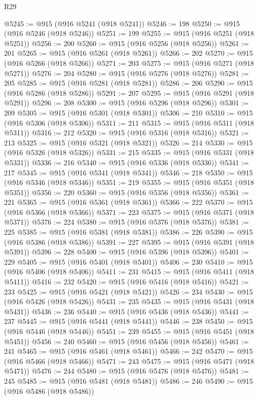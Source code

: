 \begin{lexlean}{R29}
\begin{coremodule}
@5245 := @915 (@916 @5241 (@918 @5241))
@5246 := 198
@5250 := @915 (@916 @5246 (@918 @5246))
@5251 := 199
@5255 := @915 (@916 @5251 (@918 @5251))
@5256 := 200
@5260 := @915 (@916 @5256 (@918 @5256))
@5261 := 201
@5265 := @915 (@916 @5261 (@918 @5261))
@5266 := 202
@5270 := @915 (@916 @5266 (@918 @5266))
@5271 := 203
@5275 := @915 (@916 @5271 (@918 @5271))
@5276 := 204
@5280 := @915 (@916 @5276 (@918 @5276))
@5281 := 205
@5285 := @915 (@916 @5281 (@918 @5281))
@5286 := 206
@5290 := @915 (@916 @5286 (@918 @5286))
@5291 := 207
@5295 := @915 (@916 @5291 (@918 @5291))
@5296 := 208
@5300 := @915 (@916 @5296 (@918 @5296))
@5301 := 209
@5305 := @915 (@916 @5301 (@918 @5301))
@5306 := 210
@5310 := @915 (@916 @5306 (@918 @5306))
@5311 := 211
@5315 := @915 (@916 @5311 (@918 @5311))
@5316 := 212
@5320 := @915 (@916 @5316 (@918 @5316))
@5321 := 213
@5325 := @915 (@916 @5321 (@918 @5321))
@5326 := 214
@5330 := @915 (@916 @5326 (@918 @5326))
@5331 := 215
@5335 := @915 (@916 @5331 (@918 @5331))
@5336 := 216
@5340 := @915 (@916 @5336 (@918 @5336))
@5341 := 217
@5345 := @915 (@916 @5341 (@918 @5341))
@5346 := 218
@5350 := @915 (@916 @5346 (@918 @5346))
@5351 := 219
@5355 := @915 (@916 @5351 (@918 @5351))
@5356 := 220
@5360 := @915 (@916 @5356 (@918 @5356))
@5361 := 221
@5365 := @915 (@916 @5361 (@918 @5361))
@5366 := 222
@5370 := @915 (@916 @5366 (@918 @5366))
@5371 := 223
@5375 := @915 (@916 @5371 (@918 @5371))
@5376 := 224
@5380 := @915 (@916 @5376 (@918 @5376))
@5381 := 225
@5385 := @915 (@916 @5381 (@918 @5381))
@5386 := 226
@5390 := @915 (@916 @5386 (@918 @5386))
@5391 := 227
@5395 := @915 (@916 @5391 (@918 @5391))
@5396 := 228
@5400 := @915 (@916 @5396 (@918 @5396))
@5401 := 229
@5405 := @915 (@916 @5401 (@918 @5401))
@5406 := 230
@5410 := @915 (@916 @5406 (@918 @5406))
@5411 := 231
@5415 := @915 (@916 @5411 (@918 @5411))
@5416 := 232
@5420 := @915 (@916 @5416 (@918 @5416))
@5421 := 233
@5425 := @915 (@916 @5421 (@918 @5421))
@5426 := 234
@5430 := @915 (@916 @5426 (@918 @5426))
@5431 := 235
@5435 := @915 (@916 @5431 (@918 @5431))
@5436 := 236
@5440 := @915 (@916 @5436 (@918 @5436))
@5441 := 237
@5445 := @915 (@916 @5441 (@918 @5441))
@5446 := 238
@5450 := @915 (@916 @5446 (@918 @5446))
@5451 := 239
@5455 := @915 (@916 @5451 (@918 @5451))
@5456 := 240
@5460 := @915 (@916 @5456 (@918 @5456))
@5461 := 241
@5465 := @915 (@916 @5461 (@918 @5461))
@5466 := 242
@5470 := @915 (@916 @5466 (@918 @5466))
@5471 := 243
@5475 := @915 (@916 @5471 (@918 @5471))
@5476 := 244
@5480 := @915 (@916 @5476 (@918 @5476))
@5481 := 245
@5485 := @915 (@916 @5481 (@918 @5481))
@5486 := 246
@5490 := @915 (@916 @5486 (@918 @5486))

\end{coremodule}
\end{lexlean}
